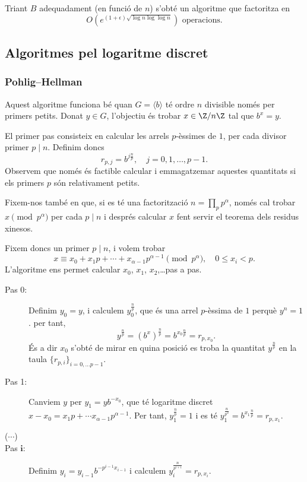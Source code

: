 \begin{proposition}
Triant $B$ adequadament (en funció de $n$) s'obté un algoritme que factoritza en
\[
O\left(e^{(1+\epsilon)\sqrt{\log n\log\log n}}\right)\text{ operacions.}
\]
\end{proposition}


\subsection{Algoritmes pel logaritme discret}
 
  \subsubsection{Pohlig--Hellman}
  Aquest algoritme funciona bé quan $G=\langle b\rangle$ té ordre $n$ divisible només per primers petits. Donat $y\in G$, l'objectiu és trobar $x\in\Z/n\Z$ tal que $b^x=y$.
  
  El primer pas consisteix en calcular les arrels $p$-èssimes de $1$, per cada divisor primer $p\mid n$. Definim doncs
  \[
  r_{p,j} = b^{j\frac{n}{p}},\quad j=0,1,\ldots,p-1.
  \]
  Observem que només és factible calcular i emmagatzemar aquestes quantitats si els primers $p$ són relativament petits.
  
  Fixem-nos també en que, si es té una factorització $n=\prod_{p} p^\alpha$, només cal trobar $x\pmod{p^\alpha}$ per cada $p\mid n$ i després calcular $x$ fent servir el teorema dels residus xinesos.
  
  Fixem doncs un primer $p\mid n$, i volem trobar
  \[
  x\equiv x_0+x_1p+\cdots+x_{\alpha-1}p^{\alpha-1}\pmod{p^\alpha},\quad 0\leq x_i<p.
  \]
  L'algoritme ens permet calcular $x_0$, $x_1$, $x_2$,\ldots pas a pas.
  
  \begin{description}
      \item[Pas 0:] Definim $y_0=y$, i calculem $y_0^{\frac{n}{p}}$, que és una arrel $p$-èssima de $1$ perquè $y^n=1$. per tant,
      \[
      y^{\frac{n}{p}} = (b^x)^{\frac{n}{p}} = b^{x_0\frac{n}{p}} = r_{p,x_0}.
      \]
      És a dir $x_0$ s'obté de mirar en quina posició es troba la quantitat $y^{\frac{n}{p}}$ en la taula $\{r_{p,i}\}_{i=0,\ldots p-1}$.
      \item[Pas 1:] Canviem $y$ per $y_1=yb^{-x_0}$, que té logaritme discret $x-x_0=x_1p+\cdots x_{\alpha-1}p^{\alpha-1}$. Per tant, $y_1^{\frac{n}{p}}=1$ i es té $y_1^{\frac{n}{p^2}}=b^{x_1\frac{n}{p}} = r_{p,x_1}$.
      
      \item[\hspace{.2cm}($\cdots$)]\hfill
      \phantom{a}
      \vspace{.3cm}
      
      \item[Pas $\mathbf{i}$:] Definim $y_i=y_{i-1}b^{-p^{i-1}x_{i-1}}$ i calculem $y_i^{\frac{n}{p^{i+1}}} = r_{p,x_i}$.
  \end{description}
  
